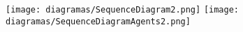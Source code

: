 %

\pagebreak
\texttt{[image: diagramas/SequenceDiagram2.png]}
\pagebreak
\texttt{[image: diagramas/SequenceDiagramAgents2.png]}
